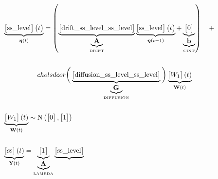 \documentclass[a4paper,landscape]{report}
\newcommand{\vect}[1]{\boldsymbol{\mathbf{#1}}}
\begin{document}
\thispagestyle{empty}
\setcounter{MaxMatrixCols}{200}
 \begin{footnotesize}
  \begin{align*}
  &\underbrace{
    \begin{bmatrix}
\text{ss\_level}
\end{bmatrix} 
    \big{(}t\big{)}}_{ \vect{\eta} (t)}	=  \left(
      \underbrace{
        \begin{bmatrix}
\text{drift\_ss\_level\_ss\_level}
\end{bmatrix}
      }_{\underbrace{\vect{A}}_\textrm{DRIFT}} \underbrace{
        \begin{bmatrix}
\text{ss\_level}
\end{bmatrix} 
        \big{(}t\big{)}
      }_{\vect{\eta} (t-1)}	+ \underbrace{
        \begin{bmatrix}
0
\end{bmatrix}
      }_{\underbrace{\vect{b}}_\textrm{CINT}}\right)  \quad + \nonumber \\ \\
    & \qquad \qquad \quad cholsdcor\bigg(\underbrace{
      \begin{bmatrix}
\text{diffusion\_ss\_level\_ss\_level}
\end{bmatrix}
    }_{\underbrace{\vect{G}}_\textrm{DIFFUSION}}\bigg)
    \underbrace{
      \begin{bmatrix}
W_{1}
\end{bmatrix} 
      (t)}_{ \vect{W}(t)} \\ \\
          &  \underbrace{\begin{bmatrix}
W_{1}
\end{bmatrix}  
            (t)}_{\vect{W}(t)} \sim  \mathrm{N} \left(
              \begin{bmatrix}
0
\end{bmatrix}, \begin{bmatrix}
1
\end{bmatrix} \right) \\ \\
&\underbrace{
      \begin{bmatrix}
\text{ss}
\end{bmatrix}  
      (t)}_{\vect{Y}(t)} = 
        \underbrace{
          \begin{bmatrix}
1
\end{bmatrix} 
        }_{\underbrace{\vect{\Lambda}}_\textrm{LAMBDA}} \underbrace{
          \begin{bmatrix}
\text{ss\_level}
\end{bmatrix} 
}
\end{align*}
\end{footnotesize}
\end{document}
